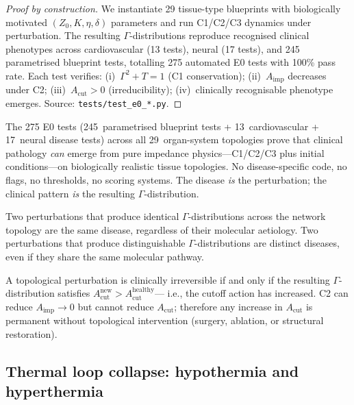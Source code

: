 \documentclass[aps,pre,twocolumn,superscriptaddress,floatfix]{revtex4-2}
\begin{document}
\begin{proof}[Proof by construction]
We instantiate 29 tissue-type blueprints with
biologically motivated $(Z_0, K, \eta, \delta)$
parameters and run C1/C2/C3 dynamics under
perturbation.
The resulting $\Gamma$-distributions reproduce
recognised clinical phenotypes across
cardiovascular (13 tests), neural (17 tests), and
245 parametrised blueprint tests,
totalling 275 automated E0 tests with 100\% pass rate.
Each test verifies:
(i)~$\Gamma^2 + T = 1$ (C1 conservation);
(ii)~$A_{\text{imp}}$ decreases under C2;
(iii)~$A_{\text{cut}} > 0$ (irreducibility);
(iv)~clinically recognisable phenotype emerges.
Source: \texttt{tests/test\_e0\_*.py}.
\end{proof}

The 275 E0 tests
(245~parametrised blueprint tests +
13~cardiovascular + 17~neural disease tests)
across all 29~organ-system topologies prove
that clinical pathology \emph{can} emerge from
pure impedance physics---C1/C2/C3 plus initial
conditions---on biologically realistic tissue
topologies.
No disease-specific code, no flags, no thresholds,
no scoring systems.
The disease \emph{is} the perturbation; the
clinical pattern \emph{is} the resulting
$\Gamma$-distribution.

\begin{corollary}
\label{cor:disease-identity}
Two perturbations that produce identical
$\Gamma$-distributions across the network topology
are the same disease, regardless of their
molecular aetiology.
Two perturbations that produce distinguishable
$\Gamma$-distributions are distinct diseases,
even if they share the same molecular pathway.
\end{corollary}

\begin{corollary}
\label{cor:irreversibility}
A topological perturbation is clinically irreversible
if and only if the resulting $\Gamma$-distribution
satisfies $A_{\text{cut}}^{\text{new}} > A_{\text{cut}}^{\text{healthy}}$---
i.e., the cutoff action has increased.
C2 can reduce $A_{\text{imp}} \to 0$ but cannot reduce
$A_{\text{cut}}$; therefore any increase in $A_{\text{cut}}$ is
permanent without topological intervention
(surgery, ablation, or structural restoration).
\end{corollary}


\subsection{Thermal loop collapse: hypothermia and
  hyperthermia}
\label{sec:thermal-collapse}
\end{document}
